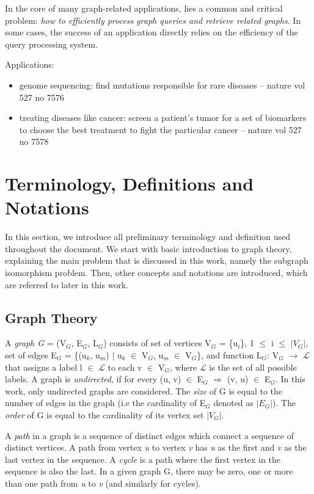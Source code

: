 \documentclass{l4proj}
\newcommand{\Lagr}{\mathcal{L}}
\begin{document}
        In the core of many graph-related applications, lies a common and critical problem: \textit{how to efficiently process graph queries and retrieve related graphs}. In some cases, the success of an application directly relies on the efficiency of the query processing system.  
        
        Applications:
        \begin{itemize}
        \item genome sequencing: find mutations responsible for rare diseases -- nature vol 527 no 7576
        \item treating diseases like cancer: screen a patient's tumor for a set of biomarkers to choose the best treatment to fight the particular cancer -- nature vol 527 no 7578
        \end{itemize}

\section{Terminology, Definitions and Notations}
\label{sec:theory}
In this section, we introduce all preliminary terminology and definition used throughout the document. We start with basic introduction to graph theory, explaining the main problem that is discussed in this work, namely the subgraph isomorphism problem. Then, other concepts and notations are introduced, which are referred to later in this work.

\subsection{Graph Theory}
\label{sec:graphTheory}

A \emph{graph G} = (V$_{G}$, E$_{G}$, L$_{G}$) consists of set of vertices V$_{G}$ = \{u$_i$\}, 1 $\leq$ i $\leq$ $|V_{G}|$, set of edges E$_{G}$ = \{(u$_k$, u$_m$) $|$ u$_k$ $\in$ V$_{G}$, u$_m$ $\in$ V$_{G}$\}, and  function  L$_{G}$: V$_{G}$ $\rightarrow$ $\Lagr$ that assigns a label l $\in$ $\Lagr$ to each v $\in$ V$_{G}$, where $\Lagr$ is the set of all possible labels. A graph is \emph{undirected}, if for every (u, v) $\in$ E$_{G}$ $\Rightarrow$ (v, u) $\in$ E$_{G}$. In this work, only undirected graphs are considered. The \emph{size} of G is equal to the number of edges in the graph (i.e the cardinality of E$_{G}$ denoted as $|E_{G}|$). The \emph{order} of G is equal to the cardinality of its vertex set $|V_{G}|$.

A \emph{path} in a graph is a sequence of distinct edges which connect a sequence of distinct vertices. A path from vertex \emph{u} to vertex \emph{v} has \emph{u} as the first and \emph{v} as the last vertex in the sequence. A \emph{cycle} is a path where the first vertex in the sequence is also the last. In a given graph G, there may be zero, one or more than one path from \emph{u} to \emph{v} (and similarly for cycles).
\end{document}
